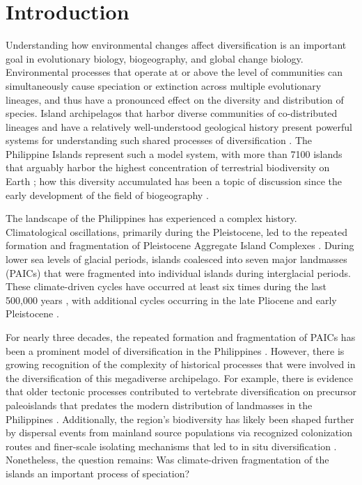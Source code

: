 \section{Introduction}

Understanding how environmental changes affect diversification is an important
goal in evolutionary biology, biogeography, and global change biology.
Environmental processes that operate at or above the level of communities can
simultaneously cause speciation or extinction across multiple evolutionary
lineages, and thus have a pronounced effect on the diversity and distribution
of species.
Island archipelagos that harbor diverse communities of co-distributed lineages
and have a relatively well-understood geological history present powerful
systems for understanding such shared processes of diversification
\citep{Gillespie2007,Losos2009,Vences2009,Rafe2013AREES}.
The Philippine Islands represent such a model system, with more than 7100
islands that arguably harbor the highest concentration of terrestrial
biodiversity on Earth
\citep{CatibogSinha2006,RafeDiesmos2009, Heaney1998,Rafe2013AREES};
how this diversity accumulated has been a topic of discussion since the
early development of the field of biogeography
\citep{Wallace1869,Huxley1868}.

The landscape of the Philippines has experienced a complex history.
Climatological oscillations, primarily during the Pleistocene, led to the
repeated formation and fragmentation of Pleistocene Aggregate Island Complexes
\citep[PAICs;][]{Inger1954,Heaney1985,RafeDiesmos2001,RafeDiesmos2009,Esselstyn2009MPE,Lomolino2010,Siler2010,Rafe2013}.
During lower sea levels of glacial periods, islands coalesced into seven major
landmasses (PAICs) that were fragmented into individual islands during
interglacial periods.
These climate-driven cycles have occurred at least six times during the last
500,000 years \citep{Rohling1998,Siddall2003}, with additional cycles
occurring in the late Pliocene and early Pleistocene
\citep{Haq1987,Miller2005}.

For nearly three decades, the repeated formation and fragmentation of PAICs has
been a prominent model of diversification in the Philippines
\citep{Inger1954,Heaney1985,RafeGuttman2002,Evans2003,Heaney2005,Roberts2006,Linkem2010,Siler2010,Siler2011,Siler2012,Rafe2013}.
However, there is growing recognition of the complexity of historical processes
that were involved in the diversification of this megadiverse archipelago.
For example,
there is evidence that older tectonic processes contributed to vertebrate
diversification on precursor paleoislands that predates the modern distribution
of landmasses in the Philippines
\citep[$\sim$30--5 mya;][]{Jansa2006,Blackburn2010,Siler2012,Rafe2013}.
Additionally, the region's biodiversity has likely been shaped further by
dispersal events from mainland source populations via recognized colonization
routes \citep[see][for a review]{Rafe2013} and finer-scale isolating
mechanisms that led to in situ diversification
\citep{Heaney2011,Linkem2011}.
Nonetheless, the question remains: Was climate-driven fragmentation of the
islands an important process of speciation? 

